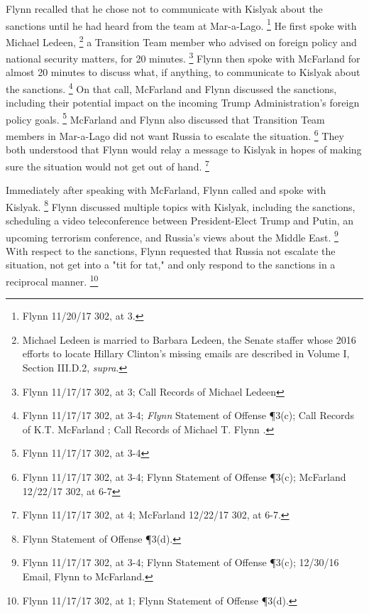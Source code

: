 Flynn recalled that he chose not to communicate with Kislyak about the sanctions until he had heard from the team at Mar-a-Lago.%
\footnote{Flynn 11/20/17 302, at 3.}
He first spoke with Michael Ledeen,%
\footnote{Michael Ledeen is married to Barbara Ledeen, the Senate staffer whose 2016 efforts to locate Hillary Clinton’s missing emails are described in Volume I, Section III.D.2, \textit{supra}.}
a Transition Team member who advised on foreign policy and national security matters, for 20 minutes.%
\footnote{Flynn 11/17/17 302, at 3;
Call Records of Michael Ledeen }
Flynn then spoke with McFarland for almost 20 minutes to discuss what, if anything, to communicate to Kislyak about the sanctions.%
\footnote{Flynn 11/17/17 302, at 3-4;
\textit{Flynn} Statement of Offense \P 3(c);
Call Records of K.T. McFarland ;
Call Records of Michael T. Flynn .
}
On that call, McFarland and Flynn discussed the sanctions, including their potential impact on the incoming Trump Administration's foreign policy goals.%
\footnote{Flynn 11/17/17 302, at 3-4}
McFarland and Flynn also discussed that Transition Team members in Mar-a-Lago did not want Russia to escalate the situation.%
\footnote{Flynn 11/17/17 302, at 3-4;
Flynn Statement of Offense \P 3(c);
McFarland 12/22/17 302, at 6-7}
They both understood that Flynn would relay a message to Kislyak in hopes of making sure the situation would not get out of hand.%
\footnote{Flynn 11/17/17 302, at 4;
McFarland 12/22/17 302, at 6-7.}

Immediately after speaking with McFarland, Flynn called and spoke with Kislyak.%
\footnote{Flynn Statement of Offense \P 3(d).}
Flynn discussed multiple topics with Kislyak, including the sanctions, scheduling a video teleconference between President-Elect Trump and Putin, an upcoming terrorism conference, and Russia's views about the Middle East.%
\footnote{Flynn 11/17/17 302, at 3-4;
Flynn Statement of Offense \P 3(c);
12/30/16 Email, Flynn to McFarland.}
With respect to the sanctions, Flynn requested that Russia not escalate the situation, not get into a "tit for tat," and only respond to the sanctions in a reciprocal manner.%
\footnote{Flynn 11/17/17 302, at 1;
Flynn Statement of Offense \P 3(d).}

